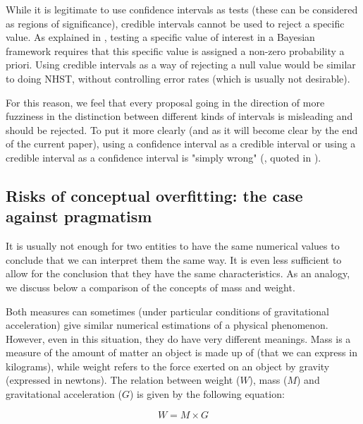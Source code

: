 \documentclass[a4paper,man,natbib,floatsintext,donotrepeattitle]{apa6}
\begin{document}
While it is legitimate to use confidence intervals as tests (these can be considered as regions of significance), credible intervals cannot be used to reject a specific value. As explained in \cite{morey_fallacy_2015}, testing a specific value of interest in a Bayesian framework requires that this specific value is assigned a non-zero probability a priori. Using credible intervals as a way of rejecting a null value would be similar to doing NHST, without controlling error rates (which is usually not desirable).

For this reason, we feel that every proposal going in the direction of more fuzziness in the distinction between different kinds of intervals is misleading and should be rejected. To put it more clearly (and as it will become clear by the end of the current paper), using a confidence interval as a credible interval or using a credible interval as a confidence interval is "simply wrong" (\citealp{berger_bayes_2006}, quoted in \citealp{morey_fallacy_2015}).

\subsection{Risks of conceptual overfitting: the case against pragmatism}

It is usually not enough for two entities to have the same numerical values to conclude that we can interpret them the same way. It is even less sufficient to allow for the conclusion that they have the same characteristics. As an analogy, we discuss below a comparison of the concepts of mass and weight.

Both measures can sometimes (under particular conditions of gravitational acceleration) give similar numerical estimations of a physical phenomenon. However, even in this situation, they do have very different meanings. Mass is a measure of the amount of matter an object is made up of (that we can express in kilograms), while weight refers to the force exerted on an object by gravity (expressed in newtons). The relation between weight ($W$), mass ($M$) and gravitational acceleration ($G$) is given by the following equation:

$$ W = M \times G $$
\end{document}

